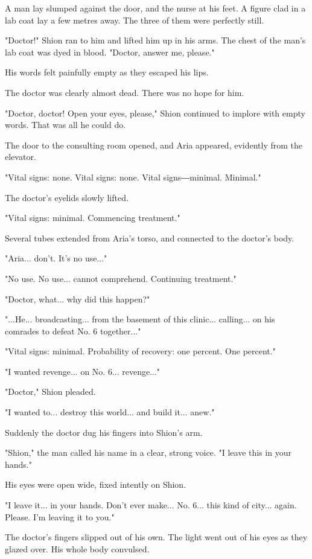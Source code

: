 A man lay slumped against the door, and the nurse at his feet. A figure
clad in a lab coat lay a few metres away. The three of them were
perfectly still.

"Doctor!" Shion ran to him and lifted him up in his arms. The chest of
the man's lab coat was dyed in blood. "Doctor, answer me, please."

His words felt painfully empty as they escaped his lips.

The doctor was clearly almost dead. There was no hope for him.

"Doctor, doctor! Open your eyes, please," Shion continued to implore
with empty words. That was all he could do.

The door to the consulting room opened, and Aria appeared, evidently
from the elevator.

"Vital signs: none. Vital signs: none. Vital signs―minimal. Minimal."

The doctor's eyelids slowly lifted.

"Vital signs: minimal. Commencing treatment."

Several tubes extended from Aria's torso, and connected to the doctor's
body.

"Aria... don't. It's no use..."

"No use. No use... cannot comprehend. Continuing treatment."

"Doctor, what... why did this happen?"

"...He... broadcasting... from the basement of this clinic... calling...
on his comrades to defeat No. 6 together..."

"Vital signs: minimal. Probability of recovery: one percent. One
percent."

"I wanted revenge... on No. 6... revenge..."

"Doctor," Shion pleaded.

"I wanted to... destroy this world... and build it... anew."

Suddenly the doctor dug his fingers into Shion's arm.

"Shion," the man called his name in a clear, strong voice. "I leave this
in your hands."

His eyes were open wide, fixed intently on Shion.

"I leave it... in your hands. Don't ever make... No. 6... this kind of
city... again. Please. I'm leaving it to you."

The doctor's fingers slipped out of his own. The light went out of his
eyes as they glazed over. His whole body convulsed.

